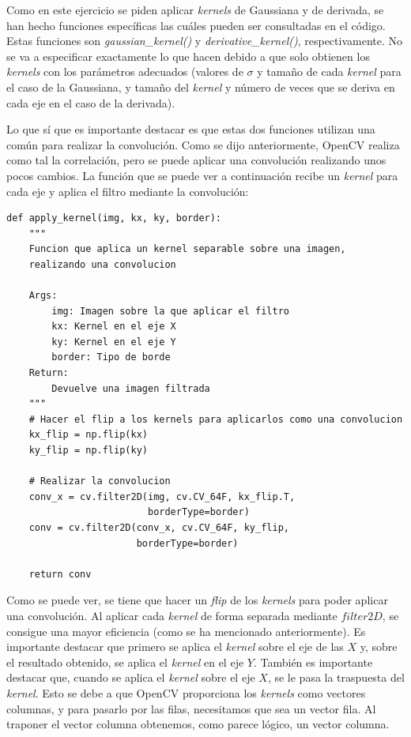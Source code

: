 \documentclass[11pt,a4paper]{article}
\begin{document}
Como en este ejercicio se piden aplicar \textit{kernels} de Gaussiana y de derivada, se han hecho funciones específicas
las cuáles pueden ser consultadas en el código. Estas funciones son \textit{gaussian\_kernel()} y \textit{derivative\_kernel()},
respectivamente. No se va a especificar exactamente lo que hacen debido a que solo obtienen los \textit{kernels} con los
parámetros adecuados (valores de $\sigma$ y tamaño de cada \textit{kernel} para el caso de la Gaussiana, y tamaño del
\textit{kernel} y número de veces que se deriva en cada eje en el caso de la derivada).

Lo que sí que es importante destacar es que estas dos funciones utilizan una común para realizar la convolución. Como se
dijo anteriormente, OpenCV realiza como tal la correlación, pero se puede aplicar una convolución realizando unos pocos cambios.
La función que se puede ver a continuación recibe un \textit{kernel} para cada eje y aplica el filtro mediante la
convolución:

\begin{lstlisting}[label={alg:apply-kernel}]
def apply_kernel(img, kx, ky, border):
    """
    Funcion que aplica un kernel separable sobre una imagen,
    realizando una convolucion

    Args:
        img: Imagen sobre la que aplicar el filtro
        kx: Kernel en el eje X
        ky: Kernel en el eje Y
        border: Tipo de borde
    Return:
        Devuelve una imagen filtrada
    """
    # Hacer el flip a los kernels para aplicarlos como una convolucion
    kx_flip = np.flip(kx)
    ky_flip = np.flip(ky)

    # Realizar la convolucion
    conv_x = cv.filter2D(img, cv.CV_64F, kx_flip.T,
    					 borderType=border)
    conv = cv.filter2D(conv_x, cv.CV_64F, ky_flip,
    				   borderType=border)

    return conv
\end{lstlisting}

Como se puede ver, se tiene que hacer un \textit{flip} de los \textit{kernels} para poder aplicar una convolución.
Al aplicar cada \textit{kernel} de forma separada mediante $filter2D$, se consigue una mayor eficiencia (como se ha
mencionado anteriormente). Es importante destacar que primero se aplica el \textit{kernel} sobre el eje de las $X$ y,
sobre el resultado obtenido, se aplica el \textit{kernel} en el eje $Y$. También es importante destacar que, cuando
se aplica el \textit{kernel} sobre el eje $X$, se le pasa la traspuesta del \textit{kernel}. Esto se debe a que
OpenCV proporciona los \textit{kernels} como vectores columnas, y para pasarlo por las filas, necesitamos que sea
un vector fila. Al traponer el vector columna obtenemos, como parece lógico, un vector columna.
\end{document}
